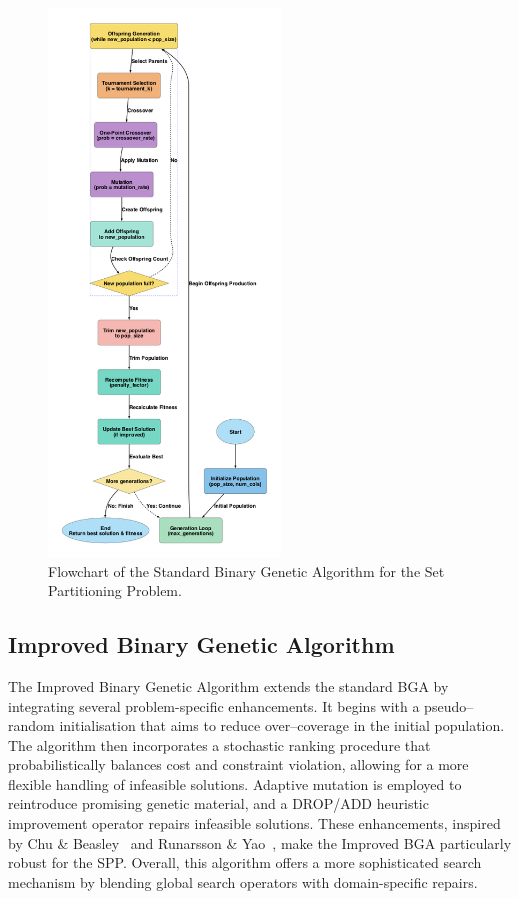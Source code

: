 \documentclass[12pt]{article}
\begin{document}
\begin{figure}[htbp]
  \centering
  \includegraphics[width=0.55\textwidth]{standard_bga_flowchart.png}
  \caption{Flowchart of the Standard Binary Genetic Algorithm for the Set Partitioning Problem.}
  \label{fig:flowchart2}
\end{figure}

\newpage

\subsection{Improved Binary Genetic Algorithm}
The Improved Binary Genetic Algorithm extends the standard BGA by integrating several problem-specific enhancements. It begins with a pseudo–random initialisation that aims to reduce over–coverage in the initial population. The algorithm then incorporates a stochastic ranking procedure that probabilistically balances cost and constraint violation, allowing for a more flexible handling of infeasible solutions. Adaptive mutation is employed to reintroduce promising genetic material, and a DROP/ADD heuristic improvement operator repairs infeasible solutions. These enhancements, inspired by Chu \& Beasley~\cite{ChuAndBeasley1998} and Runarsson \& Yao~\cite{RunarssonYao2000}, make the Improved BGA particularly robust for the SPP. Overall, this algorithm offers a more sophisticated search mechanism by blending global search operators with domain-specific repairs.
\end{document}

